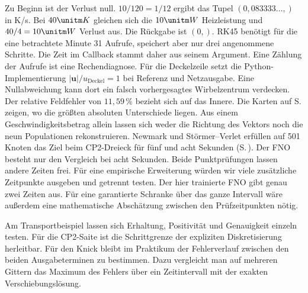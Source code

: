 Zu Beginn ist der Verlust null. \(10/120=1/12\) ergibt das Tupel \((0{,}083333\ldots,)\) in K/s. Bei \(40\unitm K\) gleichen sich die \(10\unitm W\) Heizleistung und \(40/4=10\unitm W\) Verlust aus. Die Rückgabe ist \((0,)\). RK45 benötigt für die eine betrachtete Minute 31 Aufrufe, speichert aber nur drei angenommene Schritte. Die Zeit im Callback stammt daher aus seinem Argument. Eine Zählung der Aufrufe ist eine Rechendiagnose.
Für die Deckelzeile setzt die Python-Implementierung \(|\mathbf u|/u_\mathrm{Deckel}=1\) bei Referenz und Netzausgabe. Eine Nullabweichung kann dort ein falsch vorhergesagtes Wirbelzentrum verdecken. Der relative Feldfehler von \(11{,}59\,\%\) bezieht sich auf das Innere. Die Karten auf S.\, zeigen, wo die größten absoluten Unterschiede liegen. Aus einem Geschwindigkeitsbetrag allein lassen sich weder die Richtung des Vektors noch die neun Populationen rekonstruieren.
Newmark und Störmer--Verlet erfüllen auf 501 Knoten das Ziel beim CP2-Dreieck für fünf und acht Sekunden (S.\,). Der FNO besteht nur den Vergleich bei acht Sekunden. Beide Punktprüfungen lassen andere Zeiten frei. Für eine empirische Erweiterung würden wir viele zusätzliche Zeitpunkte ausgeben und getrennt testen. Der hier trainierte FNO gibt genau zwei Zeiten aus. Für eine garantierte Schranke über das ganze Intervall wäre außerdem eine mathematische Abschätzung zwischen den Prüfzeitpunkten nötig.

Am Transportbeispiel lassen sich Erhaltung, Positivität und Genauigkeit einzeln testen. Für die CP2-Saite ist die Schrittgrenze der expliziten Diskretisierung herleitbar. Für den Knick bleibt im Praktikum der Fehlerverlauf zwischen den beiden Ausgabeterminen zu bestimmen. Dazu vergleicht man auf mehreren Gittern das Maximum des Fehlers über ein Zeitintervall mit der exakten Verschiebungslösung.

